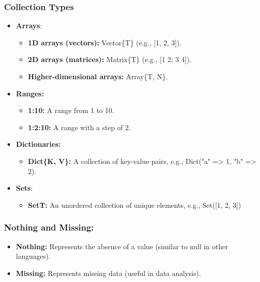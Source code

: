 \documentclass{report}
\begin{document}
    \subsubsection{Collection Types}
    \begin{itemize}
        \item \textbf{Arrays}:
            \begin{itemize}
                \item \textbf{1D arrays (vectors):} Vector\{T\} (e.g., [1, 2, 3]).
                \item \textbf{2D arrays (matrices):} Matrix\{T\} (e.g., [1 2; 3 4]).
                \item \textbf{Higher-dimensional arrays:} Array\{T, N\}.
            \end{itemize}
        \item \textbf{Ranges:}
            \begin{itemize}
                \item \textbf{1:10:} A range from 1 to 10.
                \item \textbf{1:2:10:} A range with a step of 2.
            \end{itemize}
        \item \textbf{Dictionaries:}
            \begin{itemize}
                \item \textbf{Dict\{K, V\}:} A collection of key-value pairs, e.g., Dict("a" => 1, "b" => 2).
            \end{itemize}
        \item \textbf{Sets}:
            \begin{itemize}
                \item \textbf{Set{T}:} An unordered collection of unique elements, e.g., Set([1, 2, 3])
            \end{itemize}
    \end{itemize}

    \bigbreak \noindent 
    \subsubsection{Nothing and Missing:}
    \begin{itemize}
        \item \textbf{Nothing:} Represents the absence of a value (similar to null in other languages).
        \item \textbf{Missing:} Represents missing data (useful in data analysis).
    \end{itemize}
\end{document}
